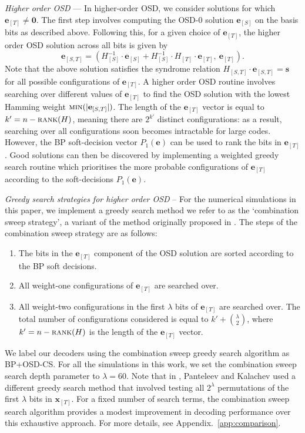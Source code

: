 \documentclass[%
 reprint,
superscriptaddress,
nofootinbib,
 amsmath,amssymb,
secnumarabic
]{revtex4-1}
\begin{document}
\textit{Higher order OSD} --- In higher-order OSD, we consider solutions for which $\mathbf{e}_{[T]}\neq \mathbf{0}$. The first step involves computing the OSD-0 solution $\mathbf{e}_{[S]}$ on the basis bits as described above. Following this, for a given choice of $\mathbf{e}_{[T]}$, the higher order OSD solution across all bits is given by
%
\begin{equation}\label{eq:osd_enc}
\mathbf{e}_{[S,T]} = \left(H_{[S]}^{-1}\cdot \mathbf{e}_{[S]}+H_{[S]}^{-1}\cdot H_{[T]} \cdot \mathbf{e}_{[T]}, \ \mathbf{e}_{[T]} \right) .\end{equation} 
%
Note that the above solution satisfies the syndrome relation $H_{[S,T]}\cdot \mathbf{e}_{[S,T]}=\mathbf{s}$ for all possible configurations of $\mathbf{e}_{[T]}$. A higher order OSD routine involves searching over different values of $\mathbf{e}_{[T]}$ to find the OSD solution with the lowest Hamming weight $\text{\sc{min}}(|\mathbf{e}_{[S,T]}|)$. The length of the $\mathbf{e}_{[T]}$ vector is equal to $k'=n-\text{\sc rank}(H)$, meaning there are $2^{k'}$ distinct configurations: as a result, searching over all configurations soon becomes intractable for large codes. However, the BP soft-decision vector $P_1(\mathbf{e})$ can be used to rank the bits in $\mathbf{e}_{[T]}$. Good solutions can then be discovered by implementing a weighted greedy search routine which prioritises the more probable configurations of $\mathbf{e}_{[T]}$ according to the soft-decisions $P_1(\mathbf{e})$.


\textit{Greedy search strategies for higher order OSD} -- For the numerical simulations in this paper, we implement a greedy search method we refer to as the `combination sweep strategy', a variant of the method originally proposed in \cite{Fossorier_1995}. The steps of the combination sweep strategy are as follows: \begin{enumerate}
	\item The bits in the $\mathbf{e}_{[T]}$ component of the OSD solution are sorted according to the BP soft decisions.
	\item All weight-one configurations of $\mathbf{e}_{[T]}$ are searched over.
	\item All weight-two configurations in the first $\lambda$ bits of $\mathbf{e}_{[T]}$ are searched over. The total number of configurations considered is equal to $k'+{\lambda \choose 2}$, where $k'=n-\text{\sc rank}(H)$ is the length of the $\mathbf{e}_{[T]}$ vector.
\end{enumerate}
%
We label our decoders using the combination sweep greedy search algorithm as BP+OSD-CS. For all the simulations in this work, we set the combination sweep search depth parameter to $\lambda=60$.  Note that in \cite{Panteleev_2019}, Panteleev and Kalachev used a different greedy search method that involved testing all $2^{\lambda}$ permutations of the first $\lambda$ bits in $\textbf{x}_{[T]}$. For a fixed number of search terms, the combination sweep search algorithm provides a modest improvement in decoding performance over this exhaustive approach. For more details, see Appendix.~\ref{app:comparison}.
\end{document}
